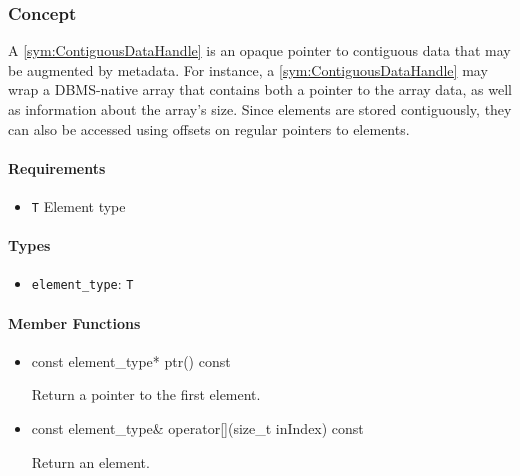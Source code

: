 \subsubsection[Concept ContiguousDataHandle]{Concept }

A \ref{sym:ContiguousDataHandle} is an opaque pointer to contiguous data that may be augmented by metadata. For instance, a \ref{sym:ContiguousDataHandle} may wrap a DBMS-native array that contains both a pointer to the array data, as well as information about the array's size. Since elements are stored contiguously, they can also be accessed using offsets on regular pointers to elements.

\paragraph{Requirements}

\begin{itemize}
	\item \texttt{T} Element type
\end{itemize}

\paragraph{Types}

\begin{itemize}
	\item
		\texttt{element\_type}: \texttt{T}
\end{itemize}

\paragraph{Member Functions}

\begin{itemize}
	\item
		\begin{cppsnippet}
		const element_type* ptr() const
		\end{cppsnippet}

		Return a pointer to the first element.

	\item
		\begin{cppsnippet}
		const element_type& operator[](size_t inIndex) const
		\end{cppsnippet}

		Return an element.
\end{itemize}

